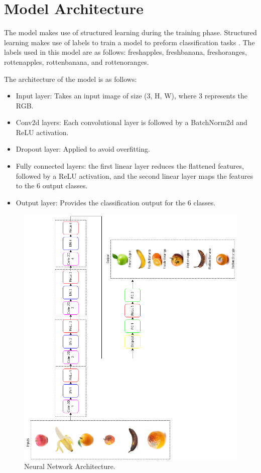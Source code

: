 \documentclass[conference]{IEEEtran}
\begin{document}
\section{Model Architecture}

The model makes use of structured learning during the training phase. Structured learning makes use of labels to train a model to preform classification tasks \cite{b1}. The labels used in this model are as follows: freshapples, freshbanana, freshoranges, rottenapples, rottenbanana, and rottenoranges.

The architecture of the model is as follows:
\begin{itemize}
    \item Input layer: Takes an input image of size (3, H, W), where 3 represents the RGB.
    \item Conv2d layers: Each convolutional layer is followed by a BatchNorm2d and ReLU activation.
    \item Dropout layer: Applied to avoid overfitting.
    \item Fully connected layers: the first linear layer reduces the flattened features, followed by a ReLU activation, and the second linear layer maps the features to the 6 output classes.
    \item Output layer: Provides the classification output for the 6 classes.
\end{itemize}

\begin{figure}[h]
    \centering
    \includegraphics[width=\linewidth]{Ai Prent.drawio (1).png}
    \caption{Neural Network Architecture.}
    \label{fig}
\end{figure}
\end{document}

